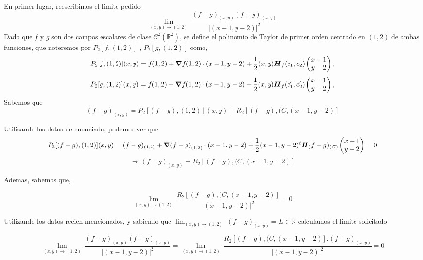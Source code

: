 \begin{solution}
   En primer lugar, reescribimos el límite pedido 
   \[
        \lim_{(x,y)\to(1,2)} \
        \frac{(f-g)_{(x,y)}(f+g)_{(x,y) }}{|(x-1,y-2)|^2}
    \]
    Dado que $f$  y $g$ son dos campos escalares de clase  $\mathcal{C}^2(\mathbb{R}^2)$,  se define  el polinomio de Taylor de primer orden centrado en $(1,2)$ de ambas funciones, que noteremos por $P_2[f,(1,2)]$ , $P_2[g,(1,2)]$ como,
    \begin{equation}
        P_2[f,(1,2)](x,y)=f(1,2)+\grad f(1,2)\cdot(x-1,y-2)+ \frac{1}{2}(x,y)\boldsymbol{H}_f(c_1,c_2)\begin{pmatrix}x-1\\y-2\end{pmatrix}, \label{eq:polTay2}
    \end{equation}
    \begin{equation}
        P_2[g,(1,2)](x,y)=f(1,2)+\grad f(1,2)\cdot(x-1,y-2)+ \frac{1}{2}(x,y)\boldsymbol{H}_f(c_1',c_2')\begin{pmatrix}x-1\\y-2\end{pmatrix}, \label{eq:polTay2}
    \end{equation}
Sabemos que
\[
        (f-g)_{(x,y)}=  P_2[(f-g),(1,2)](x,y) + R_2[(f-g),(C,(x-1,y-2)] 
    \]
  

Utilizando los datos de enunciado, podemos ver que
\[
       P_2[(f-g),(1,2)](x,y)= (f-g)_{(1,2)}+\grad (f-g)_{(1,2)}\cdot(x-1,y-2)+ \frac{1}{2}(x-1, y-2)^t\boldsymbol{H}_(f-g)_{(C)}\begin{pmatrix}x-1\\y-2\end{pmatrix} =0
    \]
    \[
      \Rightarrow 
        (f-g)_{(x,y)}=  R_2[(f-g),(C,(x-1,y-2)] 
    \]

    Ademas, sabemos que,
  
    \[
        \lim_{(x,y)\to(1,2)} \
        \frac{R_2[(f-g),(C,(x-1,y-2)]}{|(x-1,y-2)|^2}=0
    \]

Utilizando los datos recien mencionados, y sabiendo que $ \lim_{(x,y)\to(1,2)} \
        (f+g)_{(x,y) }=L \in \mathbb{R} $ calculamos el limite solicitado

  \[
        \lim_{(x,y)\to(1,2)} \
        \frac{(f-g)_{(x,y)}(f+g)_{(x,y) }}{|(x-1,y-2)|^2}=\lim_{(x,y)\to(1,2)} \
        \frac{R_2[(f-g),(C,(x-1,y-2)]. (f+g)_{(x,y) }}{|(x-1,y-2)|^2}=0
    \]
    
    
 
\end{solution}

